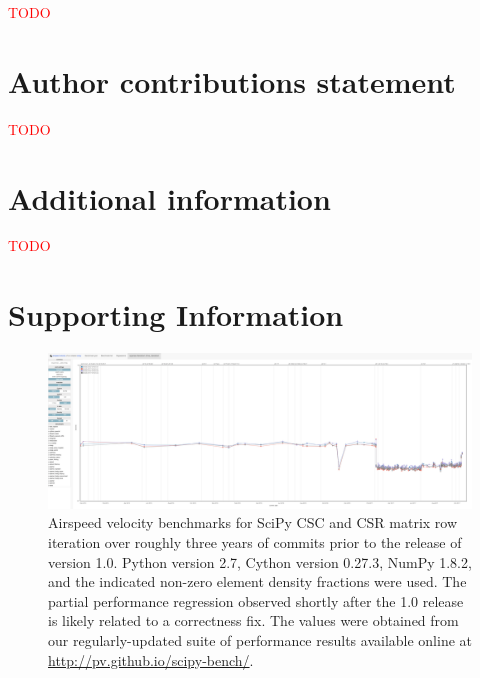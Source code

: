 \documentclass[fleqn,10pt]{wlscirep}
\newcommand{\fixme}[1]{\textcolor{red}{{#1}}}
\begin{document}
\fixme{TODO}


\section*{Author contributions statement}

\fixme{TODO}


\section*{Additional information}

\fixme{TODO}

\section*{Supporting Information}

\renewcommand{\thefigure}{S\arabic{figure}}
\setcounter{figure}{0}

\begin{figure}[H]
\centering
\includegraphics[width=\textwidth]{supporting_info/asv_bench/sparse/sparse_iteration_bench}
\caption{Airspeed velocity benchmarks for SciPy CSC and CSR matrix row iteration over roughly three years of commits prior to the release of version 1.0. Python version 2.7, Cython version 0.27.3, NumPy 1.8.2, and the indicated non-zero element density fractions were used. The partial performance regression observed shortly after the 1.0 release is likely related to a correctness fix\cite{sparse-regress}. The values were obtained from our regularly-updated suite of performance results available online at \url{http://pv.github.io/scipy-bench/}.}
\label{fig:sparse-iter}
\end{figure}
\end{document}
